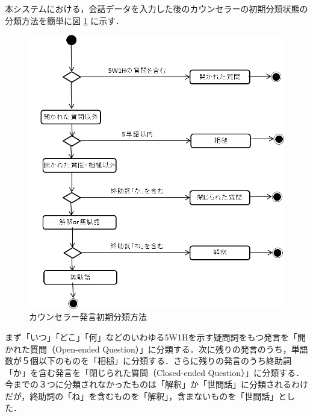 \documentclass[shuuron]{kuee}
\begin{document}
本システムにおける，会話データを入力した後のカウンセラーの初期分類状態の分類方法を簡単に図
\ref{fig:5_2}
に示す．
\begin{figure}
  \begin{center}
    \includegraphics[width=\linewidth]{5_2.png}
  \end{center}
  \caption{カウンセラー発言初期分類方法}
  \label{fig:5_2}
\end{figure}
まず「いつ」「どこ」「何」などのいわゆる5W1Hを示す疑問詞をもつ発言を「開かれた質問（Open-ended Question）」に分類する．次に残りの発言のうち，単語数が５個以下のものを「相槌」に分類する．さらに残りの発言のうち終助詞「か」を含む発言を「閉じられた質問（Closed-ended Question）」に分類する．今までの３つに分類されなかったものは「解釈」か「世間話」に分類されるわけだが，終助詞の「ね」を含むものを「解釈」，含まないものを「世間話」とした．
\end{document}
